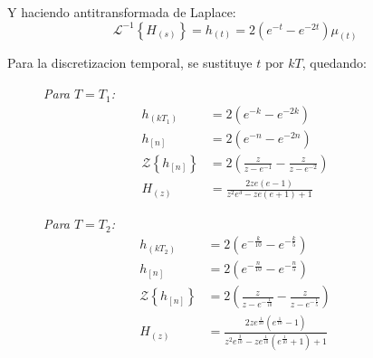 \documentclass[a4paper,12pt]{report}
\begin{document}
\begin{enumerate}[label=\alph*), left=0pt]
                Y haciendo antitransformada de Laplace:
                \begin{equation*}
                  \mathcal{L}^{-1}\left\{H_{(s)}\right\} = h_{(t)} = 2 \left(e^{-t} - e^{-2 t}\right)\mu_{(t)}
                \end{equation*}

                Para la discretizacion temporal, se sustituye $t$ por $kT$, quedando:
                \begin{figure}[!h]
                    \centering
                    \begin{minipage}{0.4\textwidth}
                        \centering
                        \textit{Para $T = T_1$:}
                        \begin{align*}
                            h_{(kT_1)} &= 2\left(e^{-k} - e^{-2 k}\right)\\
                            h_{[n]} &= 2\left(e^{-n} - e^{-2 n}\right)\\
                            \mathcal{Z}\left\{h_{[n]}\right\} &= 2\left(\frac{z}{z - e^{-1}} - \frac{z}{z - e^{-2}} \right)\\
                            H_{(z)} &= \frac{2 z e (e - 1)}{z^2 e^3 - z e (e + 1) + 1}
                        \end{align*}
                    \end{minipage}
                    \hspace{0.5cm}
                    \centering
                    \begin{minipage}{0.4\textwidth}
                        \centering
                        \textit{Para $T = T_2$:}
                        \begin{align*}
                            h_{(kT_2)} &= 2\left(e^{-\frac{k}{10}} - e^{-\frac{k}{5}}\right)\\
                            h_{[n]} &= 2\left(e^{-\frac{n}{10}} - e^{-\frac{n}{5}}\right)\\
                            \mathcal{Z}\left\{h_{[n]}\right\} &= 2\left(\frac{z}{z - e^{-\frac{1}{10}}} - \frac{z}{z - e^{-\frac{1}{5}}} \right)\\
                            H_{(z)} &= \frac{2 z e^{\frac{1}{10}} (e^{\frac{1}{10}} - 1)}{z^2 e^{\frac{3}{10}} - z  e^{\frac{1}{10}}(e^{\frac{1}{10}} + 1) + 1}
                        \end{align*}
                    \end{minipage}
                \end{figure}


\end{enumerate}
\end{document}
